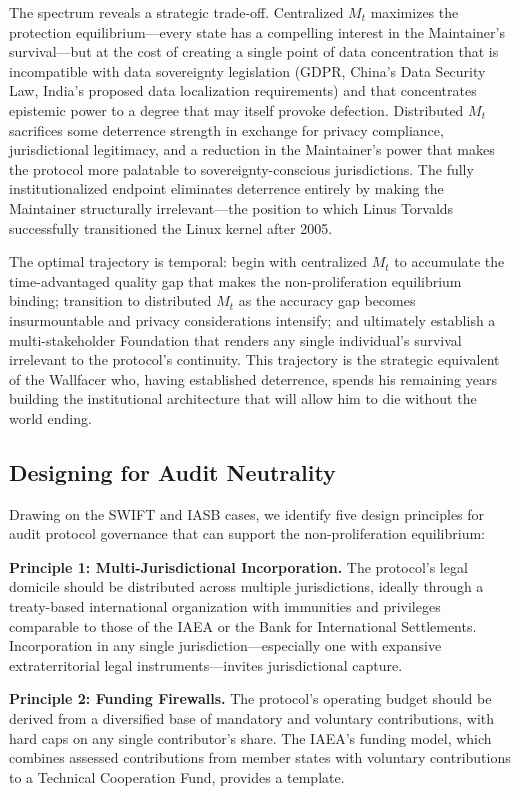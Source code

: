 \documentclass[12pt,a4paper]{article}
\theoremstyle{definition}
\theoremstyle{remark}
\begin{document}
The spectrum reveals a strategic trade-off. Centralized $M_t$ maximizes the protection equilibrium—every state has a compelling interest in the Maintainer's survival—but at the cost of creating a single point of data concentration that is incompatible with data sovereignty legislation (GDPR, China's Data Security Law, India's proposed data localization requirements) and that concentrates epistemic power to a degree that may itself provoke defection. Distributed $M_t$ sacrifices some deterrence strength in exchange for privacy compliance, jurisdictional legitimacy, and a reduction in the Maintainer's power that makes the protocol more palatable to sovereignty-conscious jurisdictions. The fully institutionalized endpoint eliminates deterrence entirely by making the Maintainer structurally irrelevant—the position to which Linus Torvalds successfully transitioned the Linux kernel after 2005.

The optimal trajectory is temporal: begin with centralized $M_t$ to accumulate the time-advantaged quality gap that makes the non-proliferation equilibrium binding; transition to distributed $M_t$ as the accuracy gap becomes insurmountable and privacy considerations intensify; and ultimately establish a multi-stakeholder Foundation that renders any single individual's survival irrelevant to the protocol's continuity. This trajectory is the strategic equivalent of the Wallfacer who, having established deterrence, spends his remaining years building the institutional architecture that will allow him to die without the world ending.

\subsection{Designing for Audit Neutrality}

Drawing on the SWIFT and IASB cases, we identify five design principles for audit protocol governance that can support the non-proliferation equilibrium:

\textbf{Principle 1: Multi-Jurisdictional Incorporation.} The protocol's legal domicile should be distributed across multiple jurisdictions, ideally through a treaty-based international organization with immunities and privileges comparable to those of the IAEA or the Bank for International Settlements. Incorporation in any single jurisdiction—especially one with expansive extraterritorial legal instruments—invites jurisdictional capture.

\textbf{Principle 2: Funding Firewalls.} The protocol's operating budget should be derived from a diversified base of mandatory and voluntary contributions, with hard caps on any single contributor's share. The IAEA's funding model, which combines assessed contributions from member states with voluntary contributions to a Technical Cooperation Fund, provides a template.
\end{document}

